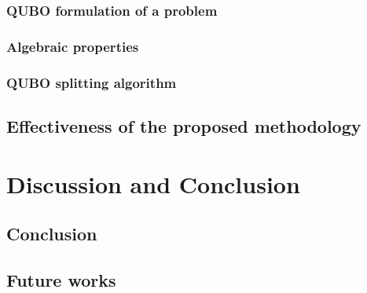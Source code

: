 \documentclass[11pt, oneside]{book}
\begin{document}
\section{QUBO formulation of a problem}
\section{Algebraic properties}
\section{QUBO splitting algorithm}

\chapter{Effectiveness of the proposed methodology}

\part{Discussion and Conclusion}

\chapter{Conclusion}

\chapter{Future works}

\end{document}
